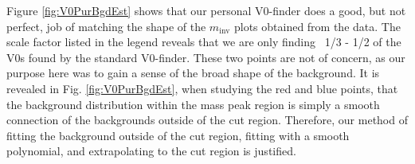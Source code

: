 \documentclass[../AnalysisNoteJBuxton.tex]{subfiles}
\begin{document}
Figure \ref{fig:V0PurBgdEst} shows that our personal V0-finder does a good, but not perfect, job of matching the shape of the $m_{\mathrm{inv}}$ plots obtained from the data.  The scale factor listed in the legend reveals that we are only finding ~1/3 - 1/2 of the V0s found by the standard V0-finder.  These two points are not of concern, as our purpose here was to gain a sense of the broad shape of the background.  It is revealed in Fig. \ref{fig:V0PurBgdEst}, when studying the red and blue points, that the background distribution within the mass peak region is simply a smooth connection of the backgrounds outside of the cut region.  Therefore, our method of fitting the background outside of the cut region, fitting with a smooth polynomial, and extrapolating to the cut region is justified.
\end{document}
